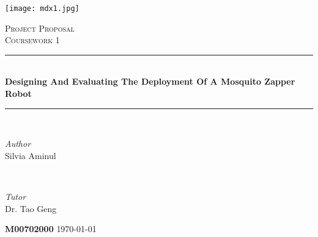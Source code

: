 \documentclass[11pt]{article}
\begin{document}
	
	\fancyhead{} %
	\fancyfoot{} %
	\fancyfoot[CO]{\thepage}
	\begin{titlepage}	
		\centering
		
		\newcommand{\HRule}{\rule{\linewidth}{0.7mm }} %
		\newcommand{\Botline}{\rule{\linewidth}{0.4mm }} %
		
		
		\texttt{[image: mdx1.jpg]}
		
		\textsc{\Large Project Proposal }\\[0.5cm] %
		
		\textsc{\large Coursework 1}\\[0.5cm] %
		
		
		\HRule\\[0.4cm]
		
		{\huge\bfseries Designing And Evaluating The Deployment Of A Mosquito Zapper Robot}\\[0.4cm] %
		
		\Botline\\[1.5cm]
		
		
		\begin{minipage}{0.4\textwidth}
			\begin{flushleft}
				\large
				\textit{Author}\\
				Silvia Aminul 
			\end{flushleft}
		\end{minipage}
		~
		\begin{minipage}{0.4\textwidth}
			\begin{flushright}
				\large
				\textit{Tutor}\\
				Dr. Tao Geng  
			\end{flushright}
			
			
		\end{minipage}
		
		
		\vfill\vfill\vfill
		
		\vfill
		
		
		
		{\bfseries M00702000 }
		\vfill
		{\large\today}
	\end{titlepage}
	\newpage
	\tableofcontents
	
\end{document}
